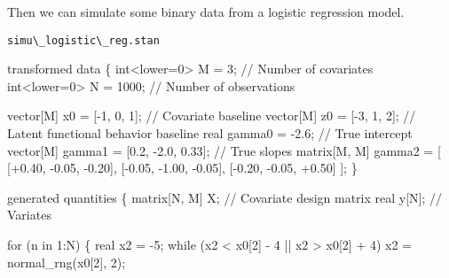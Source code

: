 \documentclass[
  letterpaper,
  DIV=11,
  numbers=noendperiod]{scrartcl}
\newenvironment{Shaded}{\begin{snugshade}}{\end{snugshade}}
\newcommand{\CommentTok}[1]{\textcolor[rgb]{0.37,0.37,0.37}{#1}}
\newcommand{\ControlFlowTok}[1]{\textcolor[rgb]{0.00,0.23,0.31}{#1}}
\newcommand{\DataTypeTok}[1]{\textcolor[rgb]{0.68,0.00,0.00}{#1}}
\newcommand{\DecValTok}[1]{\textcolor[rgb]{0.68,0.00,0.00}{#1}}
\newcommand{\FloatTok}[1]{\textcolor[rgb]{0.68,0.00,0.00}{#1}}
\newcommand{\KeywordTok}[1]{\textcolor[rgb]{0.00,0.23,0.31}{#1}}
\newcommand{\NormalTok}[1]{\textcolor[rgb]{0.00,0.23,0.31}{#1}}
\begin{document}
Then we can simulate some binary data from a logistic regression model.

\begin{codelisting}

\caption{\texttt{simu\textbackslash\_logistic\textbackslash\_reg.stan}}

\begin{Shaded}
\begin{Highlighting}[]
\KeywordTok{transformed data}\NormalTok{ \{}
  \DataTypeTok{int}\NormalTok{\textless{}}\KeywordTok{lower}\NormalTok{=}\DecValTok{0}\NormalTok{\textgreater{} M = }\DecValTok{3}\NormalTok{;         }\CommentTok{// Number of covariates}
  \DataTypeTok{int}\NormalTok{\textless{}}\KeywordTok{lower}\NormalTok{=}\DecValTok{0}\NormalTok{\textgreater{} N = }\DecValTok{1000}\NormalTok{;      }\CommentTok{// Number of observations}
  
  \DataTypeTok{vector}\NormalTok{[M] x0 = [{-}}\DecValTok{1}\NormalTok{, }\DecValTok{0}\NormalTok{, }\DecValTok{1}\NormalTok{]\textquotesingle{}; }\CommentTok{// Covariate baseline}
  \DataTypeTok{vector}\NormalTok{[M] z0 = [{-}}\DecValTok{3}\NormalTok{, }\DecValTok{1}\NormalTok{, }\DecValTok{2}\NormalTok{]\textquotesingle{}; }\CommentTok{// Latent functional behavior baseline}
  \DataTypeTok{real}\NormalTok{ gamma0 = {-}}\FloatTok{2.6}\NormalTok{;                      }\CommentTok{// True intercept}
  \DataTypeTok{vector}\NormalTok{[M] gamma1 = [}\FloatTok{0.2}\NormalTok{, {-}}\FloatTok{2.0}\NormalTok{, }\FloatTok{0.33}\NormalTok{]\textquotesingle{};   }\CommentTok{// True slopes}
  \DataTypeTok{matrix}\NormalTok{[M, M] gamma2 = [ [+}\FloatTok{0.40}\NormalTok{, {-}}\FloatTok{0.05}\NormalTok{, {-}}\FloatTok{0.20}\NormalTok{],}
\NormalTok{                          [{-}}\FloatTok{0.05}\NormalTok{, {-}}\FloatTok{1.00}\NormalTok{, {-}}\FloatTok{0.05}\NormalTok{],}
\NormalTok{                          [{-}}\FloatTok{0.20}\NormalTok{, {-}}\FloatTok{0.05}\NormalTok{, +}\FloatTok{0.50}\NormalTok{] ];}
\NormalTok{\}}

\KeywordTok{generated quantities}\NormalTok{ \{}
  \DataTypeTok{matrix}\NormalTok{[N, M] X; }\CommentTok{// Covariate design matrix}
  \DataTypeTok{real}\NormalTok{ y[N];      }\CommentTok{// Variates}

  \ControlFlowTok{for}\NormalTok{ (n }\ControlFlowTok{in} \DecValTok{1}\NormalTok{:N) \{}
    \DataTypeTok{real}\NormalTok{ x2 = {-}}\DecValTok{5}\NormalTok{;}
    \ControlFlowTok{while}\NormalTok{ (x2 \textless{} x0[}\DecValTok{2}\NormalTok{] {-} }\DecValTok{4}\NormalTok{ || x2 \textgreater{} x0[}\DecValTok{2}\NormalTok{] + }\DecValTok{4}\NormalTok{)}
\NormalTok{      x2 = normal\_rng(x0[}\DecValTok{2}\NormalTok{], }\DecValTok{2}\NormalTok{);}
    

\end{Highlighting}
\end{Shaded}
\end{codelisting}
\end{document}

